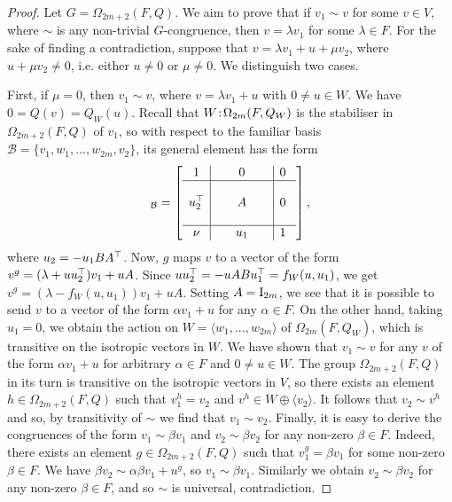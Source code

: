 \begin{proof}
	Let $G = \Omega_{2m+2}(F,Q)$. We aim to prove that if $v_1 \sim v$ for some $v \in V$, where
	$\sim$ is any non-trivial $G$-congruence, then $v = \lambda v_1$ for some $\lambda \in F$. 
	For the sake of finding a contradiction, suppose that $v = \lambda v_1 + u + \mu v_2$,
	where $u + \mu v_2 \neq 0$, i.e. either $u \neq 0$ or $\mu \neq 0$. We distinguish two cases.
	
	First, if $\mu = 0$, then $v_1 \sim v$, where $v = \lambda v_1 + u$ with $0\neq u \in W$.
	We have $0 = Q(v) = Q_W(u)$. 
	Recall that $W\mathord{{\;\!{:}\;\!}} \Omega_{2m}(F,Q_W)$ is the stabiliser in $\Omega_{2m+2}(F, Q)$ of $v_1$,
	so with respect to the familiar basis $\mathcal{B} = \{v_1, w_1 ,..., w_{2m}, v_2\}$,
	its general element has the form 
	\begin{equation*}
	[g]_{\mathcal{B}}=\left[
	    \begin{array}{c|c|c}
		1 & 0 & 0\  \\ \hline 
		 & & \\
		u_2^\T &\ \ \ \ \ A\ \ \ \ \  & 0\  \\ 
		 & & \\ \hline 
		\nu & u_1 & 1\ 
	    \end{array}
	\right],
	\end{equation*}
	where $u_2 = -u_1 BA^{\top}$. Now, $g$ maps $v$ to a vector of the form \mbox{$v^g = 
	(\lambda + u u_2^{\top}) v_1 + uA$}. Since $u u_2^{\top} = 
	-u A B u_1^{\top} = f_W(u, u_1)$, we get \mbox{$v^g = (\lambda - f_W(u, u_1))v_1 + uA$}.
	Setting $A = \mathord{\mathrm{I}}_{2m}$, we see that it is possible to send $v$ to a vector
	of the form $\alpha v_1 + u$ for any $\alpha \in F$. On the other hand, taking $u_1 = 0$,
	we obtain the action on \mbox{$W = \langle w_1, ..., w_{2m} \rangle$} 
	of $\Omega_{2m}(F,Q_W)$, which is 
	transitive on the isotropic vectors in $W$. We have shown that $v_1 \sim v$ for any $v$ of
	the form $\alpha v_1 + u$ for arbitrary $\alpha \in F$ and $0\neq u \in W$. 
	The group $\Omega_{2m+2}(F,Q)$	in 
	its turn is transitive on the isotropic vectors in $V$, so there exists an element
	\mbox{$h \in \Omega_{2m+2}(F,Q)$} such that $v_1^h = v_2$ and $v^h \in W \oplus \langle v_2 \rangle$. 
	It follows that $v_2 \sim v^h$ and so, by transitivity of $\sim$ we find that 
	$v_1 \sim v_2$. Finally, it is easy to derive the congruences of the form 
	$v_1 \sim \beta v_1$ and $v_2 \sim \beta v_2$ for any non-zero $\beta \in F$. Indeed, 
	there exists an element \mbox{$g \in  \Omega_{2m+2}(F,Q)$} such that $v_1^g = \beta v_1$ for some non-zero
	$\beta \in F$. We have $\beta v_2 \sim \alpha \beta v_1 + u^g$, so \mbox{$v_1 \sim \beta v_1$}. Similarly we obtain
	$v_2 \sim \beta v_2$ for any non-zero $\beta \in F$, and so $\sim$ is universal, contradiction.

	
	
\end{proof}


